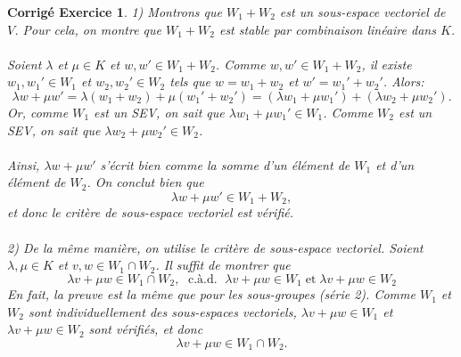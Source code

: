 \documentclass[11pt,french,table]{article}
\theoremstyle{exercice}
\theoremstyle{corrigé}
\newtheorem{corrigé}{Corrigé Exercice}
\begin{document}
\begin{corrigé}
1) Montrons que $W_1+W_2$ est un sous-espace vectoriel de $V$. Pour cela, on montre que $W_1+W_2$ est stable par combinaison linéaire dans $K$. \\ \\ 
Soient $\lambda$ et $\mu \in K$ et $w,w' \in W_1+W_2$. Comme $w,w' \in W_1+W_2$, il existe $w_1,w_1' \in W_1$ et $w_2, w_2' \in W_2$ tels que $w=w_1+w_2$ et $w'=w_1'+w_2'$. Alors: \\
$$\lambda w + \mu w' = \lambda(w_1+w_2) + \mu(w_1'+w_2') = (\lambda w_1 + \mu w_1') + (\lambda w_2 + \mu w_2').$$
Or, comme $W_1$ est un SEV, on sait que $\lambda w_1 + \mu w_1' \in W_1$. Comme $W_2$ est un SEV, on sait que $\lambda w_2 + \mu w_2' \in W_2$. \\
\\
Ainsi, $\lambda w + \mu w'$ s'écrit bien comme la somme d'un élément de $W_1$ et d'un élément de $W_2$. On conclut bien que $$\lambda w + \mu w'\in W_1 + W_2,$$
et donc le critère de sous-espace vectoriel est vérifié. \\ \\
2) De la même manière, on utilise le critère de sous-espace vectoriel. Soient $\lambda, \mu \in K$ et $v,w \in W_1 \cap W_2$. Il suffit de montrer que 
\[
\lambda v+ \mu w \in W_1 \cap W_2, \; \text{ c.à.d. } \; \lambda v+ \mu w \in W_1 \; \text{et} \; \lambda v+ \mu w \in W_2
\]
En fait, la preuve est la même que pour les sous-groupes (série 2). Comme $W_1$ et $W_2$ sont individuellement des sous-espaces vectoriels, $\lambda v+ \mu w \in W_1$ et $\lambda v+ \mu w \in W_2$ sont vérifiés, et donc $$\lambda v+ \mu w \in W_1 \cap W_2.$$




\end{corrigé}
\end{document}
